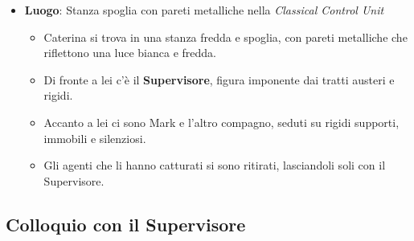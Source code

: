 \begin{itemize}
    \item \textbf{Luogo}: Stanza spoglia con pareti metalliche nella \emph{Classical Control Unit}
    \begin{itemize}
        \item Caterina si trova in una stanza fredda e spoglia, con pareti metalliche che riflettono una luce bianca e fredda.
        \item Di fronte a lei c'è il \textbf{Supervisore}, figura imponente dai tratti austeri e rigidi.
        \item Accanto a lei ci sono Mark e l'altro compagno, seduti su rigidi supporti, immobili e silenziosi.
        \item Gli agenti che li hanno catturati si sono ritirati, lasciandoli soli con il Supervisore.
    \end{itemize}
\end{itemize}

\subsection*{Colloquio con il Supervisore}

